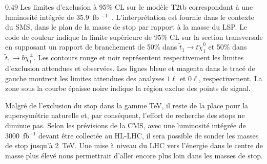                  {0.49}       %
                 {Les limites d'exclusion à 95\% CL sur le modèle T2tb correspondant à une luminosité intégrée de 35.9~fb $^{-1}$~\cite{Sirunyan:2017xse}. L'interprétation est fournie dans le contexte du SMS, dans le plan de la masse de stop par rapport à la masse du LSP. Le code de couleur indique la limite supérieure de 95\% CL sur la section transversale en supposant un rapport de branchement de 50\% dans $\tilde{t}_{1} \to t \tilde {\chi}^{0}_{1} $ et 50\% dans $\tilde{t}_{1} \to b \tilde{\chi}^{\pm}_{1} $. Les contours rouge et noir représentent respectivement les limites d'exclusion attendues et observées. Les lignes bleue et magenta dans le tracé de gauche montrent les limites attendues des analyses $ 1 \ell $ et $ 0 \ell $, respectivement. La zone sous la courbe épaisse noire indique la région exclue des points de signal. }




Malgré de l’exclusion du stop dans la gamme TeV, il reste de la place pour la supersymétrie naturelle et, par conséquent, l’effort de recherche des stops ne diminue pas. Selon les prévisions de la CMS, avec une luminosité intégrée de 3000~fb$^{-1} $ devant être collectée au HL-LHC, il sera possible de sonder les masses de stop jusqu'à 2~TeV. Une mise à niveau du LHC vers l’énergie dans le centre de masse plus élevé  nous permettrait d'aller encore plus loin dans les masses de stop.

